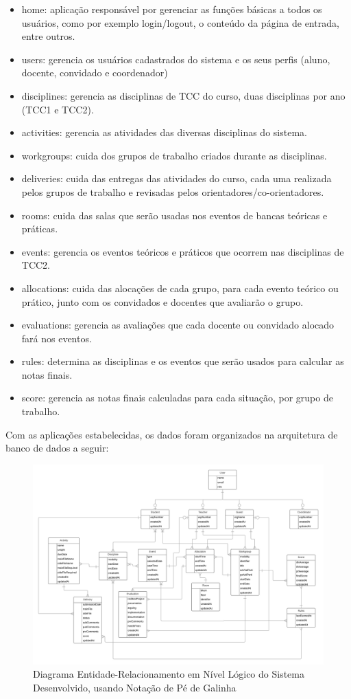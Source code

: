 \begin{itemize}
    \item home: aplicação responsável por gerenciar as funções básicas a todos os usuários, como por exemplo login/logout, o conteúdo da página de entrada, entre outros.
    \item users: gerencia os usuários cadastrados do sistema e os seus perfis (aluno, docente, convidado e coordenador)
    \item disciplines: gerencia as disciplinas de TCC do curso, duas disciplinas por ano (TCC1 e TCC2).
    \item activities: gerencia as atividades das diversas disciplinas do sistema.
    \item workgroups: cuida dos grupos de trabalho criados durante as disciplinas. 
    \item deliveries: cuida das entregas das atividades do curso, cada uma realizada pelos grupos de trabalho e revisadas pelos orientadores/co-orientadores.
    \item rooms: cuida das salas que serão usadas nos eventos de bancas teóricas e práticas.
    \item events: gerencia os eventos teóricos e práticos que ocorrem nas disciplinas de TCC2.
    \item allocations: cuida das alocações de cada grupo, para cada evento teórico ou prático, junto com os convidados e docentes que avaliarão o grupo.
    \item evaluations: gerencia as avaliações que cada docente ou convidado alocado fará nos eventos.
    \item rules: determina as disciplinas e os eventos que serão usados para calcular as notas finais.
    \item score: gerencia as notas finais calculadas para cada situação, por grupo de trabalho.
\end{itemize}

Com as aplicações estabelecidas, os dados foram organizados na arquitetura de banco de dados a seguir:

\begin{figure}[H]
    \centering
    \includegraphics[angle=90, origin=c, scale=0.65]{imagens/erd.png}
    \caption{Diagrama Entidade-Relacionamento em Nível Lógico do Sistema Desenvolvido, usando Notação de Pé de Galinha}
    \label{fig:erd}
\end{figure}

